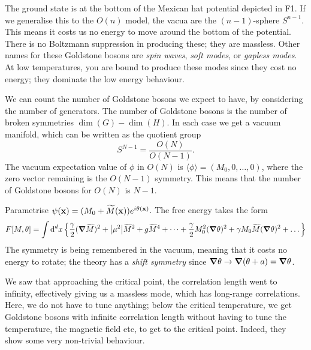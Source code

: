 
The ground state is at the bottom of the Mexican hat potential depicted in F1. 
If we generalise this to the $O(n)$ model, the vacua are the $(n-1)$-sphere $S^{n-1}$.
This means it costs us no energy to move around the bottom of the potential.
There is no Boltzmann suppression in producing these; they are massless.
Other names for these Goldstone bosons are \emph{spin waves}, \emph{soft modes}, or \emph{gapless modes}.
At low temperatures, you are bound to produce these modes since they cost no energy; they dominate the low energy behaviour.

We can count the number of Goldstone bosons we expect to have, by considering the number of generators.
The number of Goldstone bosons is the number of broken symmetries $\dim(G) - \dim(H)$.
In each case we get a vacuum manifold, which can be written as the quotient group
\begin{equation}
  S^{N-1} = \frac{O(N)}{O(N-1)}.
\end{equation}
The vacuum expectation value of $\phi$ in $O(N)$ is $\langle \phi \rangle = (M_0, 0, \dots, 0)$, where the zero vector remaining is the $O(N-1)$ symmetry.
This means that the number of Goldstone bosons for $O(N)$ is $N-1$.

\begin{example}[XY-Model]
  Parametrise $\psi(\vb{x}) = (M_0 + \widetilde{M}(\vb{x})) e^{i \theta(\vb{x})}$.
  The free energy takes the form
  \begin{equation}
    F[M, \theta] = \int \dd[d]{x} \left\{ \frac{\gamma}{2} (\grad \widetilde{M})^2 + \abs{\mu^2}\widetilde{M}^2 + g \widetilde{M}^4 + \dots + \frac{\gamma}{2} M_0^2 (\grad \theta)^2 + \gamma M_0 \widetilde{M} (\grad \theta)^2+ \dots \right\}
  \end{equation}
  The symmetry is being remembered in the vacuum, meaning that it costs no energy to rotate; the theory has a \emph{shift symmetry} since $\grad \theta \to \grad(\theta + a) = \grad \theta$.
\end{example}

We saw that approaching the critical point, the correlation length went to infinity, effectively giving us a massless mode, which has long-range correlations.
Here, we do not have to tune anything; below the critical temperature, we get Goldstone bosons with infinite correlation length without having to tune the temperature, the magnetic field etc, to get to the critical point.
Indeed, they show some very non-trivial behaviour.


